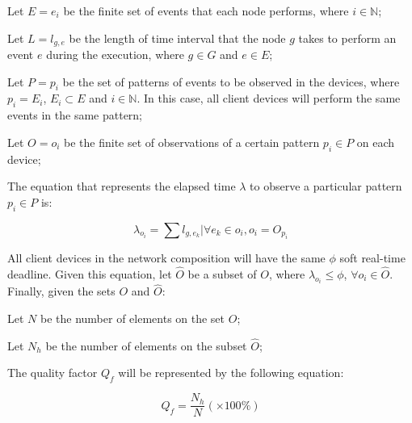 \begin{definition}
    Let $E = e_i$ be the finite set of events that each node performs, where $i \in \mathbb{N}$;
\end{definition}

\begin{definition}
    Let $L = l_{g,e}$ be the length of time interval that the node $g$ takes to perform an event $e$ during the execution, where $g \in G$ and $e \in E$;
\end{definition}

\begin{definition}
    Let $P = p_{i}$ be the set of patterns of events to be observed in the devices, where $p_i = E_i$, $E_i \subset E$ and $i \in \mathbb{N}$. In this case, all client devices will perform the same events in the same pattern;
\end{definition}

\begin{definition}
    Let $O = o_{i}$ be the finite set of observations of a certain pattern $p_i \in P$ on each device;
\end{definition}

The equation that represents the elapsed time $\lambda$ to observe a particular pattern $p_i \in P$ is:

\begin{equation}
    \lambda_{o_i} = \sum l_{g,e_k} | \forall e_k \in o_i, o_i = O_{p_i}
\end{equation}

All client devices in the network composition will have the same $\phi$ soft real-time deadline. Given this equation, let $\hat{O}$ be a subset of $O$, where $\lambda_{o_i} \leq \phi$, $\forall o_i \in \hat{O}$. Finally, given the sets $O$ and $\hat{O}$:

\begin{definition}
    Let $N$ be the number of elements on the set $O$;
\end{definition}

\begin{definition}
    Let $N_h$ be the number of elements on the subset $\hat{O}$;
\end{definition}

The quality factor $Q_f$ will be represented by the following equation:

\begin{equation}
    Q_f = \frac{N_h}{N} (\times 100 \%)
\end{equation}

